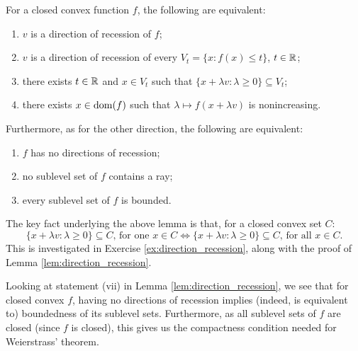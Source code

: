 \begin{Lemma}
\label{lem:direction_recession}
For a closed convex function $f$, the following are equivalent: 
\begin{enumerate}[label=(\roman*)]
\item $v$ is a direction of recession of $f$;
\item $v$ is a direction of recession of every $V_t = \{x : f(x) \leq t\}$, $t
  \in \mathbb{R}$; 
\item there exists $t \in \mathbb{R}$ and $x \in V_t$ such that $\{x + \lambda v :
  \lambda \geq 0\} \subseteq V_t$;  
\item there exists $x \in \operatorname{dom}(f)$ such that $\lambda \mapsto f(x + \lambda v)$ 
  is nonincreasing.
\end{enumerate}

Furthermore, as for the other direction, the following are equivalent: 
\begin{enumerate}[resume, label=(\roman*)]
\item $f$ has no directions of recession; 
\item no sublevel set of $f$ contains a ray;
\item every sublevel set of $f$ is bounded. 
\end{enumerate}
\end{Lemma}

The key fact underlying the above lemma is that, for a closed convex set $C$:  
\begin{equation}
\label{eq:one_iff_all}
\{x + \lambda v : \lambda \geq 0\} \subseteq C, \, \text{for one $x \in C$} \iff  
\{x + \lambda v : \lambda \geq 0\} \subseteq C, \, \text{for all $x \in C$}. 
\end{equation}
This is investigated in Exercise \ref{ex:direction_recession}, along with the
proof of Lemma \ref{lem:direction_recession}.

Looking at statement (vii) in Lemma \ref{lem:direction_recession}, we see that
for closed convex $f$, having no directions of recession implies (indeed, is
equivalent to) boundedness of its sublevel sets. Furthermore, as all sublevel
sets of $f$ are closed (since $f$ is closed), this gives us the compactness
condition needed for Weierstrass' theorem.     

